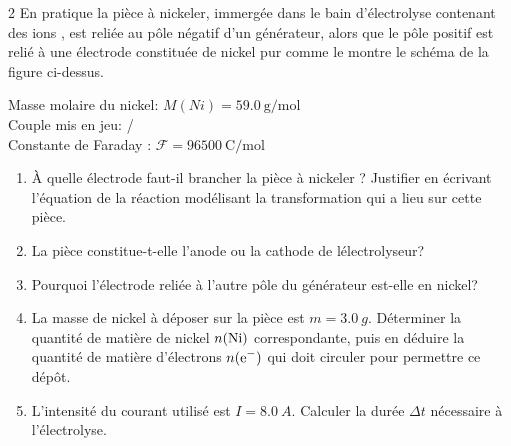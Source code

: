 \documentclass[a4paper,11pt,fleqn]{scrartcl}%
\begin{document}
\begin{multicols}{2}
En pratique la pièce à nickeler, immergée dans le bain d'électrolyse contenant des ions , est reliée au pôle négatif d'un générateur, alors que le pôle positif est relié à une électrode constituée de nickel pur comme le montre le schéma de la figure ci-dessus.
\begin{data}
    Masse molaire du nickel: $M(Ni) = \SI{59,0}{\gram\per\mole}$\\
    Couple mis en jeu: /\\
    Constante de Faraday : $\mathcal{F} =\SI{96500}{\coulomb\per\mole}$
\end{data}
\begin{enumerate}
    \item À quelle électrode faut-il brancher la pièce à nickeler ? Justifier en écrivant l'équation de la réaction modélisant la transformation qui a lieu sur cette pièce.
    \item La pièce constitue-t-elle l'anode ou la cathode de lélectrolyseur?
    \item Pourquoi l'électrode reliée à l'autre pôle du générateur est-elle en nickel?
    \item La masse de nickel à déposer sur la pièce est $m = \SI{3,0}{g}$. Déterminer la quantité de matière de nickel $n(\ce{Ni})$ correspondante, puis en déduire la quantité de matière d'électrons $n(\ce{e-})$ qui doit circuler pour permettre ce dépôt.
    \item L'intensité du courant utilisé est $I = \SI{8,0}{A}$. Calculer la durée $\Delta t$ nécessaire à l'électrolyse.
\end{enumerate}
\end{multicols}
\end{document}
